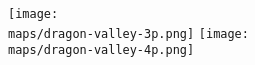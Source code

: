 \begin{multicols*}{2}
\begin{center}
  \vspace*{\fill}
  \texttt{[image: \\maps/dragon-valley-3p.png]}
  \vspace*{\fill}
  \texttt{[image: \\maps/dragon-valley-4p.png]}
  \vspace*{\fill}
\end{center}
\vspace*{\fill}

\end{multicols*}
